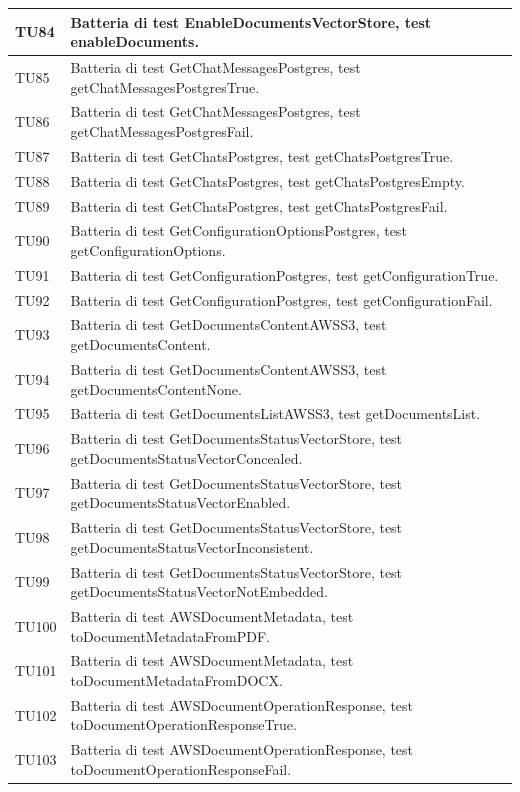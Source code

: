 \documentclass[10pt, a4paper]{article}
\begin{document}
\begin{xltabular}{\textwidth}{p{0.12\textwidth}|X}
\hline
TU84 & Batteria di test EnableDocumentsVectorStore, test enableDocuments. \\
\hline
TU85 & Batteria di test GetChatMessagesPostgres, test getChatMessagesPostgresTrue. \\
\hline
TU86 & Batteria di test GetChatMessagesPostgres, test getChatMessagesPostgresFail. \\
\hline
TU87 & Batteria di test GetChatsPostgres, test getChatsPostgresTrue. \\
\hline
TU88 & Batteria di test GetChatsPostgres, test getChatsPostgresEmpty. \\
\hline
TU89 & Batteria di test GetChatsPostgres, test getChatsPostgresFail. \\
\hline
TU90 & Batteria di test GetConfigurationOptionsPostgres, test getConfigurationOptions. \\
\hline
TU91 & Batteria di test GetConfigurationPostgres, test getConfigurationTrue. \\
\hline
TU92 & Batteria di test GetConfigurationPostgres, test getConfigurationFail. \\
\hline
TU93 & Batteria di test GetDocumentsContentAWSS3, test getDocumentsContent. \\
\hline
TU94 & Batteria di test GetDocumentsContentAWSS3, test getDocumentsContentNone. \\
\hline
TU95 & Batteria di test GetDocumentsListAWSS3, test getDocumentsList. \\
\hline
TU96 & Batteria di test GetDocumentsStatusVectorStore, test getDocumentsStatusVectorConcealed. \\
\hline
TU97 & Batteria di test GetDocumentsStatusVectorStore, test getDocumentsStatusVectorEnabled. \\
\hline
TU98 & Batteria di test GetDocumentsStatusVectorStore, test getDocumentsStatusVectorInconsistent. \\
\hline
TU99 & Batteria di test GetDocumentsStatusVectorStore, test getDocumentsStatusVectorNotEmbedded. \\
\hline
TU100 & Batteria di test AWSDocumentMetadata, test toDocumentMetadataFromPDF. \\
\hline
TU101 & Batteria di test AWSDocumentMetadata, test toDocumentMetadataFromDOCX. \\
\hline
TU102 & Batteria di test AWSDocumentOperationResponse, test toDocumentOperationResponseTrue. \\
\hline
TU103 & Batteria di test AWSDocumentOperationResponse, test toDocumentOperationResponseFail. \\

\end{xltabular}
\end{document}
